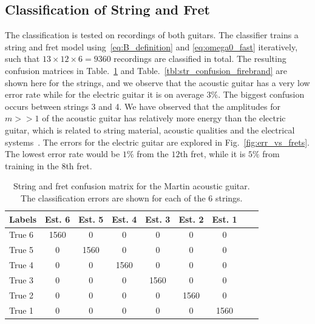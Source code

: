\documentclass{article}
\begin{document}
\subsection{Classification of String and Fret} %
\label{sec:string_fret_classification}
\vspace{-.6mm}
The classification is tested on recordings of both guitars. 
The classifier trains a string and fret model using~\eqref{eq:B_definition} and \eqref{eq:omega0_fast} iteratively, such that $13\times12\times6 = 9360$ recordings are classified in total. The resulting confusion matrices in Table.~\ref{tbl:string_confusion_martin} and Table.~\ref{tbl:str_confusion_firebrand} are shown here for the strings, and we observe that the acoustic guitar has a very low error rate while for the electric guitar it is on average $3\%$. The biggest confusion occurs between strings 3 and 4. We have observed that the amplitudes for $m>>1$ of the acoustic guitar has relatively more energy than the electric guitar, which is related to string material, acoustic qualities and the electrical systems~\cite{fletcher:physics_of_musical_instruments}.  
The errors for the electric guitar are explored in Fig.~\ref{fig:err_vs_frets}. The lowest error rate would be $1\%$ from the $12$th fret, while it is $5\%$ from training in the $8$th fret. \vspace{-.6mm}
%
\begin{table}\centering \vspace{-1mm}
\caption{String and fret confusion matrix for the Martin  acoustic guitar. The classification errors are shown for each of the 6 strings.}
\label{tbl:string_confusion_martin}
\begin{tabularx}{0.46\textwidth}{@{}l*{7}{c}c@{}}
\toprule
Labels &Est. 6   &Est. 5 &Est. 4   &Est. 3   &Est. 2   &Est. 1   \\ 
\midrule
True 6   &1560 \cellcolor[gray]{.8} &0  &0  &0  &0  &0  \\  
True 5   &0  & 1560\cellcolor[gray]{.8} & 0   &0  &0  &0  \\
True 4   &0  &0  &1560 \cellcolor[gray]{.8} &0  &0  &0  \\  
True 3   &0  &0  &0  &1560 \cellcolor[gray]{.8} &0  &0  \\  
True 2   &0  &0  &0  &0  &1560 \cellcolor[gray]{.8} &0  \\  
True 1   &0  &0  &0  &0  &0  &1560 \cellcolor[gray]{.8} \\  
\bottomrule
\end{tabularx}
\end{table}\vspace{-.6mm}
\end{document}
